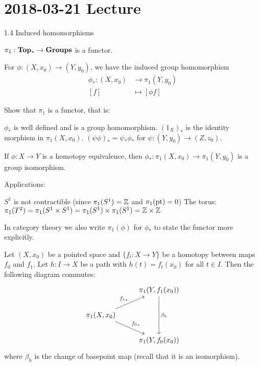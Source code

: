 \section{2018-03-21 Lecture}

1.4 Induced homomorphisms

\begin{rmk}
	$\pi_1: \mathbf{Top_*} \to \mathbf{Groups}$ is a functor.
\end{rmk}

\begin{defn}
	For $\phi: (X,x_0) \to (Y,y_0)$, we have the induced group homomorphism
	\begin{align*}
		\phi_*: (X,x_0) &\to \pi_1(Y,y_0) \\
		[f] &\mapsto [\phi f]
	\end{align*}
\end{defn}

\begin{exer}
	Show that $\pi_1$ is a functor, that is:
	\begin{enum}
		\io $\phi_*$ is well defined and is a group homomorphism.
		\io $(1_X)_*$ is the identity morphism in $\pi_1(X,x_0)$.
		\io $(\psi\phi)_*=\psi_*\phi_*$ for $\psi: (Y,y_0) \to (Z,z_0)$.
	\end{enum}
\end{exer}

\begin{thm}\label{thm:iso}
	If $\phi: X \to Y$ is a homotopy equivalence, then $\phi_*: \pi_1(X,x_0) \to \pi_1(Y,y_0)$ is a group isomorphism.
\end{thm}

\begin{cor}
	Applications:
	\begin{itm}
		\io $S^1$ is not contractible (since $\pi_1(S^1) = \mathbb{Z}$ and $\pi_1(\operatorname{pt})=0$)
		\io The torus: $\pi_1(T^2) = \pi_1(S^1 \times S^1) = \pi_1(S^1) \times \pi_1(S^1) = \mathbb{Z} \times \mathbb{Z}$
	\end{itm}
\end{cor}

\begin{rmk}
	In category theory we also write $\pi_1(\phi)$ for $\phi_*$ to state the functor more explicitly.
\end{rmk}

\begin{prop}
	Let $(X,x_0)$ be a pointed space and $\{f_t:X \to Y\}$ be a homotopy between maps $f_0$ and $f_1$.
	Let $h: I \to X$ be a path with $h(t)=f_t(x_0)$ for all $t \in I$.
	Then the following diagram commutes:
	\[
		\begin{tikzcd}
			& \pi_1(Y,f_1(x_0)) \ar[dd, "\beta_h"] \\
			\pi_1(X,x_0) \ar[ur, "{f_1}_*"] \ar[dr, "{f_0}_*"] & \\
			& \pi_1(Y,f_0(x_0))
		\end{tikzcd}
	\]
	where $\beta_h$ is the change of basepoint map (recall that it is an isomorphism).
\end{prop}

